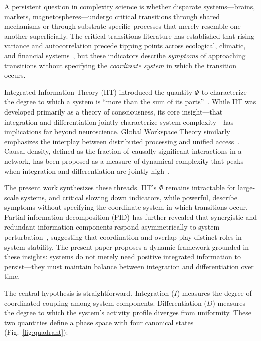 \documentclass[aip,cha,reprint,amsmath,amssymb,final,floatfix]{revtex4-2}
\begin{document}
A persistent question in complexity science is whether disparate systems---brains, markets, magnetospheres---undergo critical transitions through shared mechanisms or through substrate-specific processes that merely resemble one another superficially. The critical transitions literature has established that rising variance and autocorrelation precede tipping points across ecological, climatic, and financial systems~\cite{scheffer2009,dakos2012}, but these indicators describe \emph{symptoms} of approaching transitions without specifying the \emph{coordinate system} in which the transition occurs.

Integrated Information Theory (IIT) introduced the quantity $\Phi$ to characterize the degree to which a system is ``more than the sum of its parts''~\cite{tononi2016,tononi2004}. While IIT was developed primarily as a theory of consciousness, its core insight---that integration and differentiation jointly characterize system complexity---has implications far beyond neuroscience. Global Workspace Theory similarly emphasizes the interplay between distributed processing and unified access~\cite{baars1988}. Causal density, defined as the fraction of causally significant interactions in a network, has been proposed as a measure of dynamical complexity that peaks when integration and differentiation are jointly high~\cite{seth2011}.

The present work synthesizes these threads. IIT's $\Phi$ remains intractable for large-scale systems, and critical slowing down indicators, while powerful, describe symptoms without specifying the coordinate system in which transitions occur. Partial information decomposition (PID) has further revealed that synergistic and redundant information components respond asymmetrically to system perturbation~\cite{williams2010,popiel2020}, suggesting that coordination and overlap play distinct roles in system stability. The present paper proposes a dynamic framework grounded in these insights: systems do not merely need positive integrated information to persist---they must maintain balance between integration and differentiation over time.

The central hypothesis is straightforward. Integration ($I$) measures the degree of coordinated coupling among system components. Differentiation ($D$) measures the degree to which the system's activity profile diverges from uniformity. These two quantities define a phase space with four canonical states (Fig.~\ref{fig:quadrant}):
\end{document}
